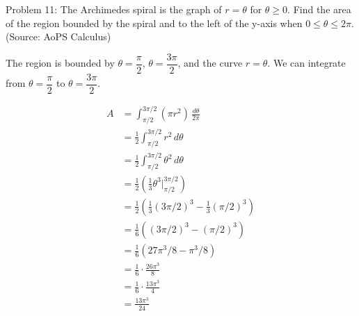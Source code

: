 Problem 11: The Archimedes spiral is the graph of $r = \theta$ for $\theta \geq 0$. Find the area of the region bounded by the spiral and to the left of the y-axis when $0 \leq \theta \leq 2\pi$. (Source: AoPS Calculus)

The region is bounded by $\theta = \dfrac{\pi}{2}$, $\theta = \dfrac{3\pi}{2}$, and the curve $r = \theta$. We can integrate from $\theta = \dfrac{\pi}{2}$ to $\theta = \dfrac{3\pi}{2}$.

\begin{align*}
A &= \int_{\pi/2}^{3\pi/2} (\pi r^2) \, \frac{d\theta}{2\pi} \\
&= \frac{1}{2} \int_{\pi/2}^{3\pi/2} r^2 \, d\theta \\
&= \frac{1}{2} \int_{\pi/2}^{3\pi/2} \theta^2 \, d\theta \\
&= \frac{1}{2} \left( \frac{1}{3} \theta^3 \Bigg|_{\pi/2}^{3\pi/2} \right) \\
&= \frac{1}{2} \left( \frac{1}{3} (3\pi/2)^3 - \frac{1}{3} (\pi/2)^3 \right) \\
&= \frac{1}{6} \left( (3\pi/2)^3 - (\pi/2)^3 \right) \\
&= \frac{1}{6} \left( 27\pi^3/8 - \pi^3/8 \right) \\
&= \frac{1}{6} \cdot \frac{26\pi^3}{8} \\
&= \frac{1}{6} \cdot \frac{13\pi^3}{4} \\
&= \boxed{\frac{13\pi^3}{24}}
\end{align*}
